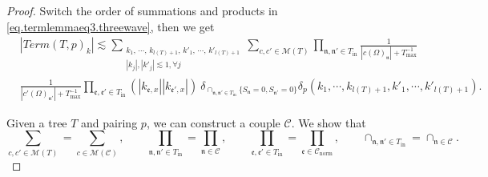 \begin{proof}
Switch the order of summations and products in \eqref{eq.termlemmaeq3.threewave}, then we get
\begin{equation}\label{eq.termlemmaeq2.threewave}
\begin{split}
    &|Term(T, p)_k|\lesssim \sum_{\substack{k_1,\, \cdots,\, k_{l(T)+1},\, k'_1,\, \cdots,\, k'_{l(T)+1}\\ |k_{j}|, |k'_j|\lesssim 1, \forall j}} \sum_{c, c'\in \mathscr{M}(T) }\prod_{\mathfrak{n}, \mathfrak{n}'\in T_{\text{in}}}\frac{1}{|c(\Omega)_{\mathfrak{n}}|+T^{-1}_{\text{max}}}
    \\
    &\frac{1}{|c'(\Omega)_{\mathfrak{n}'}|+T^{-1}_{\text{max}}}\prod_{\mathfrak{e},\mathfrak{e}'\in T_{\text{in}}}(|k_{\mathfrak{e},x}||k_{\mathfrak{e}',x}|)\ \delta_{\cap_{\mathfrak{n},\mathfrak{n}'\in T_{\text{in}}} \{S_{\mathfrak{n}}=0, S_{\mathfrak{n}'}=0\}} \delta_{p}(k_1,\cdots, k_{l(T)+1}, k'_1,\cdots, k'_{l(T)+1}).
\end{split}
\end{equation}

Given a tree $T$ and pairing $p$, we can construct a couple $\mathcal{C}$. We show that 
\begin{equation}\label{eq.termlemmaeq4.threewave}
\sum_{c, c'\in \mathscr{M}(T) }=\sum_{c\in \mathscr{M}(\mathcal{C}) },\qquad \prod_{\mathfrak{n}, \mathfrak{n}'\in T_{\text{in}}}=\prod_{\mathfrak{n}\in \mathcal{C}}, \qquad \prod_{\mathfrak{e},\mathfrak{e}'\in T_{\text{in}}}=\prod_{\mathfrak{e}\in \mathcal{C}_{\text{norm}}},\qquad \cap_{\mathfrak{n},\mathfrak{n}'\in T_{\text{in}}}=\cap_{\mathfrak{n}\in \mathcal{C}}.    
\end{equation}



\end{proof}
